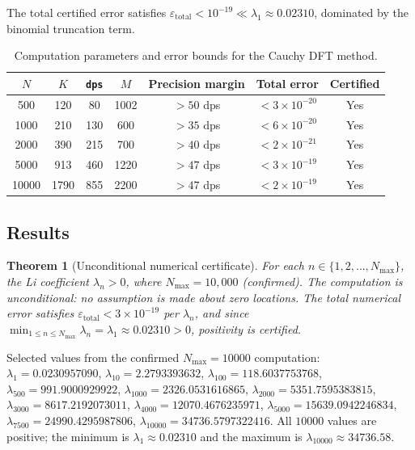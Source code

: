 \documentclass[11pt]{article}
\newtheorem{theorem}{Theorem}
\begin{document}
The total certified error satisfies $\varepsilon_{\mathrm{total}} < 10^{-19} \ll \lambda_1 \approx 0.02310$,
dominated by the binomial truncation term.

\begin{table}[H]
\centering
\begin{tabular}{ccccccc}
\toprule
$N$ & $K$ & \texttt{dps} & $M$ & Precision margin & Total error & Certified \\
\midrule
500   & 120  & 80  & 1002 & $>50$ dps & $< 3\times10^{-20}$ & Yes \\
1000  & 210  & 130 & 600  & $>35$ dps & $< 6\times10^{-20}$ & Yes \\
2000  & 390  & 215 & 700  & $>40$ dps & $< 2\times10^{-21}$ & Yes \\
5000  & 913  & 460 & 1220 & $>47$ dps & $< 3\times10^{-19}$ & Yes \\
10000 & 1790 & 855 & 2200 & $>47$ dps & $< 2\times10^{-19}$ & Yes \\
\bottomrule
\end{tabular}
\caption{Computation parameters and error bounds for the Cauchy DFT method.}
\label{tab:cauchy_params}
\end{table}

\subsection{Results}

\begin{theorem}[Unconditional numerical certificate]
\label{thm:cauchy_dft}
For each $n \in \{1, 2, \ldots, N_{\max}\}$, the Li coefficient $\lambda_n > 0$,
where $N_{\max} = 10{,}000$ (confirmed).
The computation is unconditional: no assumption is made about zero locations.
The total numerical error satisfies $\varepsilon_{\mathrm{total}} < 3\times10^{-19}$
per $\lambda_n$, and since $\min_{1 \le n \le N_{\max}} \lambda_n = \lambda_1 \approx 0.02310 > 0$,
positivity is certified.
\end{theorem}

Selected values from the confirmed $N_{\max} = 10000$ computation:
$\lambda_1 = 0.0230957090$,
$\lambda_{10} = 2.2793393632$,
$\lambda_{100} = 118.6037753768$,
$\lambda_{500} = 991.9000929922$,
$\lambda_{1000} = 2326.0531616865$,
$\lambda_{2000} = 5351.7595383815$,
$\lambda_{3000} = 8617.2192073011$,
$\lambda_{4000} = 12070.4676235971$,
$\lambda_{5000} = 15639.0942246834$,
$\lambda_{7500} = 24990.4295987806$,
$\lambda_{10000} = 34736.5797322416$.
All $10000$ values are positive; the minimum is $\lambda_1 \approx 0.02310$
and the maximum is $\lambda_{10000} \approx 34736.58$.
\end{document}
